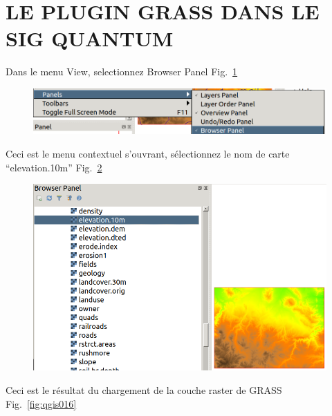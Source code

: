 \section{LE PLUGIN GRASS DANS LE SIG QUANTUM}

Dans le menu View, selectionnez Browser Panel Fig.~\ref{fig:qgis014}

\begin{figure}[htbp]
   \centering
   \includegraphics[scale=0.26]{qgis014.png}
   \caption{}
   \label{fig:qgis014}
\end{figure}

Ceci est le menu contextuel s'ouvrant, s\'electionnez le nom de carte ``elevation.10m'' Fig.~\ref{fig:qgis015}

\begin{figure}[htbp]
   \centering
   \includegraphics[scale=0.28]{qgis015.png}
   \caption{}
   \label{fig:qgis015}
\end{figure}
 

Ceci est le r\'esultat du chargement de la couche raster de GRASS Fig.~\ref{fig:qgis016}


